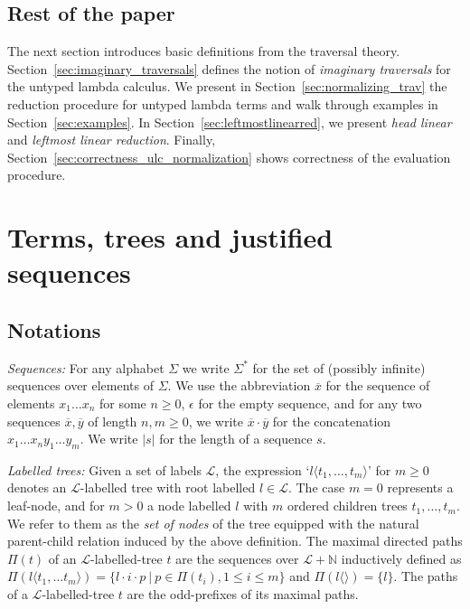 \documentclass[xchauthor,chkrefs,GCNS,amsmath,amsthm,rotating,leaveRGB]{tcsg}
\theoremstyle{plain}
\theoremstyle{definition}
\begin{document}
\subsection{Rest of the paper}\label{sec1.4}

The next section introduces basic definitions from the traversal theory.
Section~\ref{sec:imaginary_traversals} defines the notion of \emph{imaginary
traversals} for the untyped lambda calculus. We present in
Section~\ref{sec:normalizing_trav} the reduction procedure for untyped lambda
terms and walk through examples in Section~\ref{sec:examples}. In
Section~\ref{sec:leftmostlinearred}, we present \emph{head linear} and
\emph{leftmost linear reduction}. Finally,
Section~\ref{sec:correctness_ulc_normalization} shows correctness of the
evaluation procedure.

\section{Terms, trees and justified sequences}\label{sec:basic_def}

\subsection{Notations}\label{sec2.1}

\emph{Sequences:} For any alphabet $\Sigma $ we write $\Sigma ^{*}$ for the
set of (possibly infinite) sequences over elements of $\Sigma $. We use the
abbreviation $\overline{x}$ for the sequence of elements $x_{1} \ldots x_{n}$
for some $n\geq 0$, $\epsilon $ for the empty sequence, and for any two
sequences $\overline{x}, \overline{y}$ of length $n,m\geq 0$, we write
$\overline{x} \cdot \overline{y}$ for the concatenation $x_{1} \ldots x_{n}
y_{1} \ldots y_{m}$. We write $|s|$ for the length of a sequence $s$.

\emph{Labelled trees:} Given a set of labels $\mathcal{L}$, the expression
`$l\langle t_{1}, \ldots , t_{m} \rangle $' for $m \geq 0$ denotes an
$\mathcal{L}$-labelled tree with root labelled $l\in \mathcal{L}$. The case
$m=0$ represents a leaf-node, and for $m>0$ a node labelled $l$ with $m$
ordered children trees $t_{1}, \ldots , t_{m}$. We refer to them as the
\emph{set of nodes} of the tree equipped with the natural parent-child
relation induced by the above definition. The maximal directed paths $\Pi
(t)$ of an $\mathcal{L}$-labelled-tree $t$ are the sequences over $\mathcal{L}
+ \mathbb {N}$ inductively defined as $\Pi (l \langle t_{1}, \ldots t_{m}
\rangle ) = \{ l \cdot i \cdot p \ |  \ p \in \Pi (t_{i}), 1\leq i \leq m \}$
and $\Pi (l\langle \rangle ) = \{ l \}$. The paths of a
$\mathcal{L}$-labelled-tree $t$ are the odd-prefixes of its maximal paths.
\end{document}
